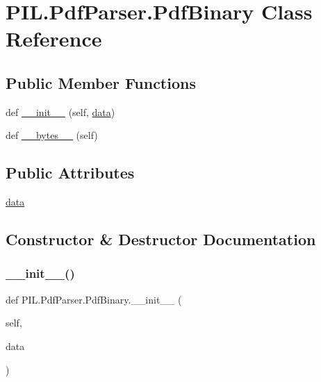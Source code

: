 \hypertarget{classPIL_1_1PdfParser_1_1PdfBinary}{}\section{P\+I\+L.\+Pdf\+Parser.\+Pdf\+Binary Class Reference}
\label{classPIL_1_1PdfParser_1_1PdfBinary}
\subsection*{Public Member Functions}
\begin{DoxyCompactItemize}
\item 
def \hyperlink{classPIL_1_1PdfParser_1_1PdfBinary_a5233eef27c60e85213a36c41bff72862}{\+\_\+\+\_\+init\+\_\+\+\_\+} (self, \hyperlink{classPIL_1_1PdfParser_1_1PdfBinary_ab2e527ff50deeb4f8f94e9e222160c25}{data})
\item 
def \hyperlink{classPIL_1_1PdfParser_1_1PdfBinary_a05f372e5fdfe0d1c2aa7c51aa189141c}{\+\_\+\+\_\+bytes\+\_\+\+\_\+} (self)
\end{DoxyCompactItemize}
\subsection*{Public Attributes}
\begin{DoxyCompactItemize}
\item 
\hyperlink{classPIL_1_1PdfParser_1_1PdfBinary_ab2e527ff50deeb4f8f94e9e222160c25}{data}
\end{DoxyCompactItemize}


\subsection{Constructor \& Destructor Documentation}
\mbox{\label{classPIL_1_1PdfParser_1_1PdfBinary_a5233eef27c60e85213a36c41bff72862}} 
\subsubsection{\texorpdfstring{\+\_\+\+\_\+init\+\_\+\+\_\+()}{\_\_init\_\_()}}
{\footnotesize\ttfamily def P\+I\+L.\+Pdf\+Parser.\+Pdf\+Binary.\+\_\+\+\_\+init\+\_\+\+\_\+ (\begin{DoxyParamCaption}\item[{}]{self,  }\item[{}]{data }\end{DoxyParamCaption})}



